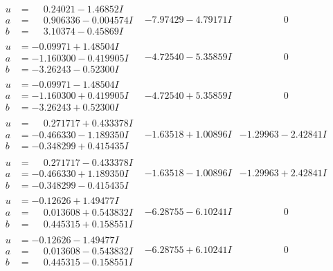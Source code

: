 \documentclass[1p]{elsarticle_modified}
\theoremstyle{definition}
\begin{document}
$$\begin{array}{c|c|c}
\begin{aligned}
u &= \phantom{-}0.24021 - 1.46852 I \\
a &= \phantom{-}0.906336 - 0.004574 I \\
b &= \phantom{-}3.10374 - 0.45869 I\end{aligned}
 & -7.97429 - 4.79171 I & \phantom{-0.000000 } 0 \\ \hline\begin{aligned}
u &= -0.09971 + 1.48504 I \\
a &= -1.160300 - 0.419905 I \\
b &= -3.26243 - 0.52300 I\end{aligned}
 & -4.72540 - 5.35859 I & \phantom{-0.000000 } 0 \\ \hline\begin{aligned}
u &= -0.09971 - 1.48504 I \\
a &= -1.160300 + 0.419905 I \\
b &= -3.26243 + 0.52300 I\end{aligned}
 & -4.72540 + 5.35859 I & \phantom{-0.000000 } 0 \\ \hline\begin{aligned}
u &= \phantom{-}0.271717 + 0.433378 I \\
a &= -0.466330 - 1.189350 I \\
b &= -0.348299 + 0.415435 I\end{aligned}
 & -1.63518 + 1.00896 I & -1.29963 - 2.42841 I \\ \hline\begin{aligned}
u &= \phantom{-}0.271717 - 0.433378 I \\
a &= -0.466330 + 1.189350 I \\
b &= -0.348299 - 0.415435 I\end{aligned}
 & -1.63518 - 1.00896 I & -1.29963 + 2.42841 I \\ \hline\begin{aligned}
u &= -0.12626 + 1.49477 I \\
a &= \phantom{-}0.013608 + 0.543832 I \\
b &= \phantom{-}0.445315 + 0.158551 I\end{aligned}
 & -6.28755 - 6.10241 I & \phantom{-0.000000 } 0 \\ \hline\begin{aligned}
u &= -0.12626 - 1.49477 I \\
a &= \phantom{-}0.013608 - 0.543832 I \\
b &= \phantom{-}0.445315 - 0.158551 I\end{aligned}
 & -6.28755 + 6.10241 I & \phantom{-0.000000 } 0 \\ \hline\begin{aligned}

\end{aligned}
\end{array}$$
\end{document}
